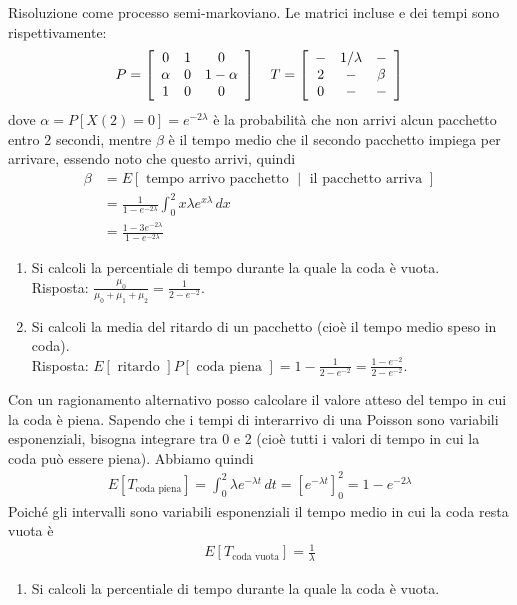 \documentclass{article}
\begin{document}
\begin{enumerate}
    Risoluzione come processo semi-markoviano. Le matrici incluse e dei tempi sono rispettivamente:
    \begin{align*}
    P=\left[\begin{array}{c c c}
    0 & 1 & 0\\
    \alpha & 0 & 1-\alpha\\
    1 & 0 & 0
    \end{array}\right]
    \quad
    T=\left[\begin{array}{c c c}
    - & 1/\lambda & -\\
    2 &- &\beta\\
    0 & -& -
    \end{array}\right]
    \end{align*}
    dove $\alpha =P[X(2)=0] = e^{-2\lambda}$ è la probabilità che non arrivi alcun pacchetto entro $2$ secondi, mentre $\beta$ è il tempo medio che il secondo pacchetto impiega per arrivare, essendo noto che questo arrivi, quindi
    \begin{align*}
    \beta &= E[\text{ tempo arrivo pacchetto }\mid\text{ il pacchetto arriva }]\\
    &= \frac{1}{1-e^{-2\lambda}}\int_0^2x\lambda e^{x\lambda}\,dx\\
    &= \frac{1-3e^{-2\lambda}}{1-e^{-2\lambda}}
    \end{align*}
    \begin{enumerate}[label=\alph*)]
        \item Si calcoli la percentiale di tempo durante la quale la coda è vuota.\\
        
        Risposta: $\frac{\mu_0}{\mu_0+\mu_1+\mu_2}=\frac{1}{2-e^{-2}}$.
        \item Si calcoli la media del ritardo di un pacchetto (cioè il tempo medio speso in coda).\\
        
        Risposta: $E[\text{ ritardo }] P[\text{ coda piena }] = 1 - \frac{1}{2-e^{-2}} = \frac{1-e^{-2}}{2-e^{-2}}$.
    \end{enumerate}
    
    Con un ragionamento alternativo posso calcolare il valore atteso del tempo in cui la coda è piena.
    Sapendo che i tempi di interarrivo di una Poisson sono variabili esponenziali, bisogna integrare tra 0 e 2 (cioè tutti i valori di tempo in cui la coda può essere piena).
    Abbiamo quindi
    \begin{align*}
    E[T_{\text{coda piena}}] = \int_0^2 \lambda e^{-\lambda t}\,dt = \left[ e^{-\lambda t} \right]_0^2 = 1 - e^{-2\lambda}
    \end{align*}
    Poiché gli intervalli sono variabili esponenziali il tempo medio in cui la coda resta vuota è
    \begin{align*}
    E[T_{\text{coda vuota}}] = \frac{1}{\lambda}
    \end{align*}
    \begin{enumerate}[label=\alph*)]
        \item Si calcoli la percentiale di tempo durante la quale la coda è vuota.\\
        

\end{enumerate}
\end{enumerate}
\end{document}
